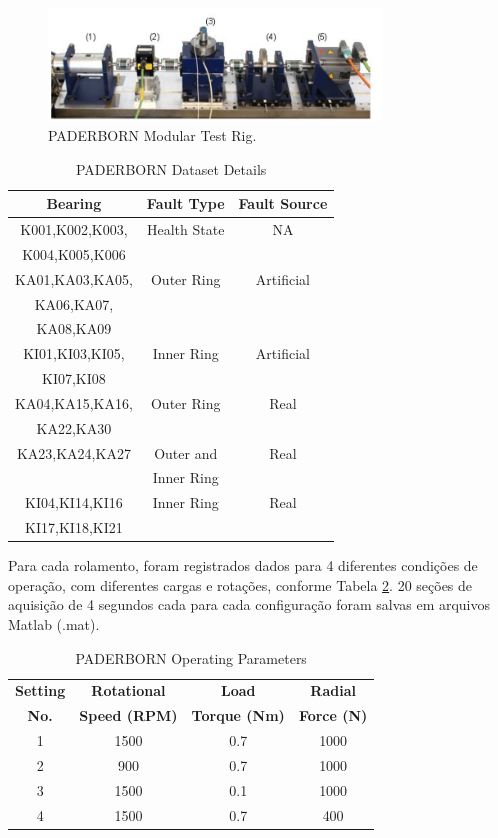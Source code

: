 \documentclass[conference]{IEEEtran}
\begin{document}
\begin{figure}[htbp]
\centerline{\includegraphics[height=30mm]{artigo/fig2.png}}
\caption{PADERBORN Modular Test Rig.}
\label{fig2}
\end{figure}


\begin{table}[htbp]
\caption{PADERBORN Dataset Details}
\begin{center}
\begin{tabular}{|c|c|c|}
\hline
\textbf{Bearing}&{\textbf{Fault Type}}&{\textbf{Fault Source}}\\
\hline
K001,K002,K003,&Health State&NA\\
K004,K005,K006&&\\
KA01,KA03,KA05,&Outer Ring&Artificial\\
KA06,KA07,&&\\
KA08,KA09&&\\
KI01,KI03,KI05,&Inner Ring&Artificial\\
KI07,KI08&&\\
KA04,KA15,KA16,&Outer Ring&Real\\
KA22,KA30&&\\
KA23,KA24,KA27&Outer and&Real\\
&Inner Ring&\\
KI04,KI14,KI16&Inner Ring&Real\\
KI17,KI18,KI21&&\\
\hline
\end{tabular}
\label{tab3}
\end{center}
\end{table}

Para cada rolamento, foram registrados dados para 4 diferentes condições de operação, com diferentes cargas e rotações, conforme Tabela \ref{tab4}.
20 seções de aquisição de 4 segundos cada para cada configuração foram salvas em arquivos Matlab (.mat).

\begin{table}[htbp]
\caption{PADERBORN Operating Parameters}
\begin{center}
\begin{tabular}{|c|c|c|c|}
\hline
\textbf{Setting}&{\textbf{Rotational}}&{\textbf{Load}}&{\textbf{Radial}}\\
 \textbf{No.}&\textbf{Speed (RPM)}&\textbf{Torque (Nm)}&\textbf{Force (N)}\\
\hline
1&1500&0.7&1000\\
2&900&0.7&1000\\
3&1500&0.1&1000\\
4&1500&0.7&400\\
\hline
\end{tabular}
\label{tab4}
\end{center}
\end{table}
\end{document}

